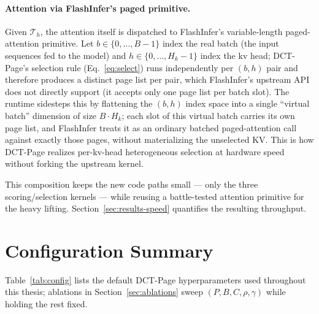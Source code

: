 \paragraph{Attention via FlashInfer's paged primitive.}
Given $\mathcal{T}_h$, the attention itself is dispatched to
FlashInfer's variable-length paged-attention primitive.  Let
$b \in \{0, \dots, B-1\}$ index the real batch (the input sequences
fed to the model) and $h \in \{0, \dots, H_k-1\}$ index the kv head;
DCT-Page's selection rule (Eq.~\eqref{eq:select}) runs independently
per $(b, h)$ pair and therefore produces a distinct page list per
pair, which FlashInfer's upstream API does not directly support
(it accepts only one page list per batch slot).  The runtime
sidesteps this by flattening the $(b, h)$ index space into a single
``virtual batch'' dimension of size $B \cdot H_k$; each slot of this
virtual batch carries its own page list, and FlashInfer treats it as
an ordinary batched paged-attention call against exactly those pages,
without materializing the unselected KV.  This is how DCT-Page
realizes per-kv-head heterogeneous selection at hardware speed
without forking the upstream kernel.

This composition keeps the new code paths small --- only the three
scoring/selection kernels --- while reusing a battle-tested attention
primitive for the heavy lifting.  Section~\ref{sec:results-speed}
quantifies the resulting throughput.


\section{Configuration Summary}\label{sec:config}

Table~\ref{tab:config} lists the default DCT-Page hyperparameters used
throughout this thesis; ablations in Section~\ref{sec:ablations} sweep
$(P, B, C, \rho, \gamma)$ while holding the rest fixed.

